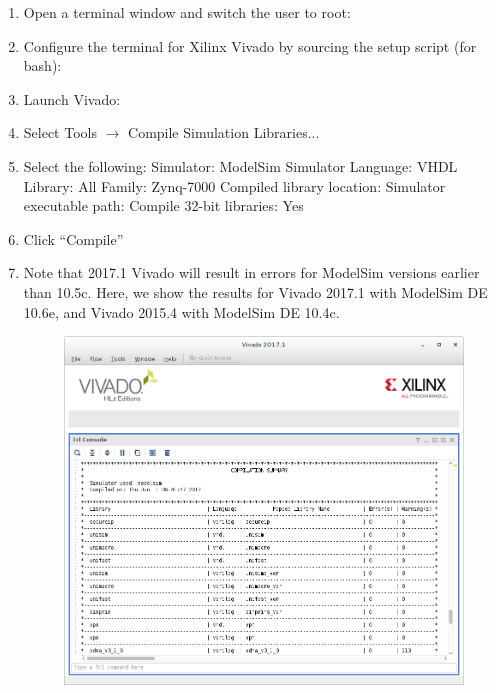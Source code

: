\begin{flushleft}
\begin{flushleft}
	\begin{enumerate}
		\item Open a terminal window and switch the user to root:
			\subitem {}
		\item Configure the terminal for Xilinx Vivado by sourcing the setup script (for bash):
			\subitem {}
		\item Launch Vivado:
			\subitem {}
		\item Select Tools $\rightarrow$ Compile Simulation Libraries...
		\item Select the following:
			\subitem Simulator: ModelSim Simulator
			\subitem Language: VHDL
			\subitem Library: All
			\subitem Family: Zynq-7000
			\subitem Compiled library location: 
			\subitem Simulator executable path: 
			\subitem Compile 32-bit libraries: Yes
		\item Click ``Compile''
		\item Note that 2017.1 Vivado will result in errors for ModelSim versions earlier than 10.5c. Here, we show the results for Vivado 2017.1 with ModelSim DE 10.6e, and Vivado 2015.4 with ModelSim DE 10.4c.
	\begin{figure}[H]
	\centering\captionsetup{type=figure}\includegraphics[scale=0.5]{figures/xilinx_vivado_2017_compsimlib_out}

\end{figure}
\end{enumerate}
\end{flushleft}
\end{flushleft}
